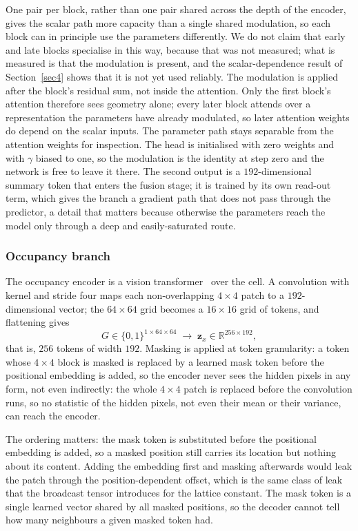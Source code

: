 \documentclass[pdflatex,oneside,sn-mathphys-num]{sn-jnl}
\theoremstyle{thmstyleone}
\theoremstyle{thmstyletwo}
\theoremstyle{thmstylethree}
\begin{document}
One pair per block, rather than one pair shared across the depth of the encoder, gives the
scalar path more capacity than a single shared modulation, so each block can in principle use
the parameters differently. We do not claim that early and late blocks specialise in this way,
because that was not measured; what is measured is that the modulation is present, and the
scalar-dependence result of Section~\ref{sec4} shows that it is not yet used reliably. The modulation is applied
after the block's residual sum, not inside the attention. Only the first block's attention
therefore sees geometry alone; every later block attends over a representation the
parameters have already modulated, so later attention weights do depend on the scalar
inputs. The parameter path stays separable from the attention weights for inspection. The head is initialised with zero
weights and with $\gamma$ biased to one, so the modulation is the identity at step zero
and the network is free to leave it there. The second output is a $192$-dimensional
summary token that enters the fusion stage; it is trained by its own read-out term,
which gives the branch a gradient path that does not pass through the predictor, a
detail that matters because otherwise the parameters reach the model only through a
deep and easily-saturated route.

\subsubsection{Occupancy branch}
The occupancy encoder is a vision transformer~\cite{vit} over the cell. A convolution
with kernel and stride four maps each non-overlapping $4\times4$ patch to a
$192$-dimensional vector; the $64\times64$ grid becomes a $16\times16$ grid of tokens,
and flattening gives
\begin{equation}
G\in\{0,1\}^{1\times64\times64}
\;\longrightarrow\;\mathbf{z}_x\in\mathbb{R}^{256\times192},
\end{equation}
that is, $256$ tokens of width $192$. Masking is applied at token granularity: a token
whose $4\times4$ block is masked is replaced by a learned mask token before the
positional embedding is added, so the encoder never sees the hidden pixels in any form, not even indirectly: the whole $4\times4$ patch is
replaced before the convolution runs, so no statistic of the hidden pixels, not even their mean
or their variance, can reach the encoder.

The ordering matters: the mask token is substituted before the positional
embedding is added, so a masked position still carries its location but nothing
about its content. Adding the embedding first and masking afterwards would leak
the patch through the position-dependent offset, which is the same class of leak
that the broadcast tensor introduces for the lattice constant. The mask token is a
single learned vector shared by all masked positions, so the decoder cannot tell
how many neighbours a given masked token had.
\end{document}
